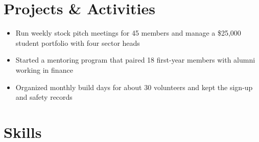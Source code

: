 \documentclass{atsresume}
\begin{document}
\section{Projects \& Activities}

\begin{itemize}
  \item Run weekly stock pitch meetings for 45 members and manage a
    \$25,000 student portfolio with four sector heads
  \item Started a mentoring program that paired 18 first-year members with
    alumni working in finance
\end{itemize}

\begin{itemize}
  \item Organized monthly build days for about 30 volunteers and kept the
    sign-up and safety records
\end{itemize}

\section{Skills}

\end{document}

